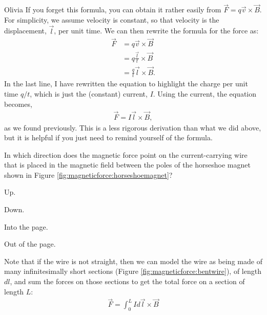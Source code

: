 \begin{studentOpinion}{Olivia}
If you forget this formula, you can obtain it rather easily from $\vec F=q\vec v\times \vec B$. For simplicity, we assume velocity is constant, so that velocity is the displacement, $\vec l$, per unit time. We can then rewrite the formula for the force as:
\begin{align*}
\vec F&=q\vec v\times \vec B\\
&=q\frac{\vec l}{t}\times \vec B\\
&=\frac{q}{t}\vec l\times \vec B.
\end{align*}
In the last line, I have rewritten the equation to highlight the charge per unit time $q/t$, which is just the (constant) current, $I$. Using the current, the equation becomes,
\begin{align*}
\vec F=I\vec l\times \vec B,
\end{align*}
as we found previously. This is a less rigorous derivation than what we did above, but it is helpful if you just need to remind yourself of the formula.
\end{studentOpinion}

\begin{checkpoint}{}
	\begin{MCquestion}{In which direction does the magnetic force point on the current-carrying wire that is placed in the magnetic field between the poles of the horseshoe magnet shown in Figure \ref{fig:magneticforce:horseshoemagnet}?}
		\item Up. \correct
		\item Down.
		\item Into the page.
		\item Out of the page.
	\end{MCquestion}
\end{checkpoint}

Note that if the wire is not straight, then we can model the wire as being made of many infinitesimally short sections (Figure \ref{fig:magneticforce:bentwire}), of length $dl$, and sum the forces on those sections to get the total force on a section of length $L$:
\begin{align*}
\vec F = \int_0^L I d\vec l \times \vec B
\end{align*}

